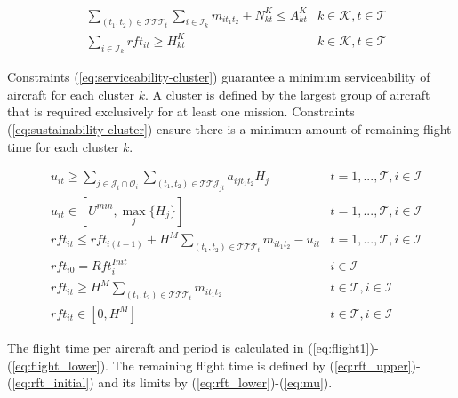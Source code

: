 \documentclass[a4paper,onecolumn,fleqn]{article}
\begin{document}

    \begin{align}
       & \sum_{(t_1, t_2) \in \mathcal{T}\mathcal{T}\mathcal{T}_{t}} \sum_{i \in \mathcal{I}_k} m_{it_1t_2} + N^K_{kt} \leq A^K_{kt}
        &k \in \mathcal{K}, t \in \mathcal{T} \label{eq:serviceability-cluster} \\
       & \sum_{i \in \mathcal{I}_k} rft_{it} \geq H^K_{kt}
        &k \in \mathcal{K}, t \in \mathcal{T} \label{eq:sustainability-cluster}
    \end{align}

    Constraints (\ref{eq:serviceability-cluster}) guarantee a minimum serviceability of aircraft for each cluster $k$. A cluster is defined by the largest group of aircraft that is required exclusively for at least one mission. Constraints (\ref{eq:sustainability-cluster}) ensure there is a minimum amount of remaining flight time for each cluster $k$.

    \begin{align}
         & u_{it} \geq \sum_{j \in \mathcal{J}_t \cap \mathcal{O}_i} \sum_{(t_1, t_2) \in \mathcal{T}\mathcal{T}\mathcal{J}_{jt}} a_{ijt_1t_2} H_j 
            & t =1, ..., \mathcal{T}, i \in \mathcal{I} \label{eq:flight1}\\
         & u_{it} \in [U^{min}, \max_j{\{H_j\}}]
            & t =1, ..., \mathcal{T}, i \in \mathcal{I} \label{eq:flight_lower}\\
         & rft_{it} \leq rft_{i(t-1)} + H^M \sum_{(t_1, t_2) \in \mathcal{T}\mathcal{T}\mathcal{T}_{t}} m_{it_1t_2} - u_{it}
            & t =1, ..., \mathcal{T}, i \in \mathcal{I} \label{eq:rft_upper}\\
        & rft_{i0} = Rft^{Init}_i
               & i \in \mathcal{I} \label{eq:rft_initial}\\
        & rft_{it} \geq H^M \sum_{(t_1, t_2) \in \mathcal{T}\mathcal{T}\mathcal{T}_{t}} m_{it_1t_2}
                &t \in \mathcal{T}, i \in \mathcal{I}\label{eq:rft_lower}\\
        & rft_{it} \in [0,H^M]
                & t \in \mathcal{T}, i \in \mathcal{I} \label{eq:mu}
    \end{align}

    The flight time per aircraft and period is calculated in (\ref{eq:flight1})-(\ref{eq:flight_lower}). The remaining flight time is defined by (\ref{eq:rft_upper})-(\ref{eq:rft_initial}) and its limits by (\ref{eq:rft_lower})-(\ref{eq:mu}).
\end{document}
